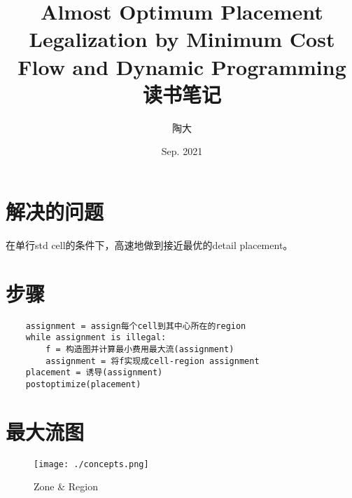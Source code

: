 \documentclass[UTF8,a4paper]{ctexart}
\title{Almost Optimum Placement Legalization by Minimum Cost Flow and Dynamic Programming\\
    读书笔记}
\author{陶大}
\date{Sep. 2021}
\begin{document}
\maketitle
\tableofcontents

\section{解决的问题}

在单行std cell的条件下，高速地做到接近最优的detail placement。

\section{步骤}

\begin{verbatim}
    assignment = assign每个cell到其中心所在的region
    while assignment is illegal:
        f = 构造图并计算最小费用最大流(assignment)
        assignment = 将f实现成cell-region assignment
    placement = 诱导(assignment)
    postoptimize(placement)
\end{verbatim}

\section{最大流图}

\begin{figure}
    \begin{center}
        \texttt{[image: ./concepts.png]}    
    \end{center}
    \caption{Zone \& Region}
\end{figure}
\end{document}
